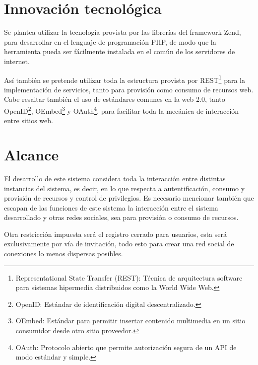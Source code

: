 \documentclass[letterpaper,11pt]{article}
\begin{document}
\section{Innovación tecnológica}
Se plantea utilizar la tecnología provista por las librerías del framework Zend, para
desarrollar en el lenguaje de programación PHP, de modo que la herramienta pueda ser
fácilmente instalada en el común de los servidores de internet.

Así también se pretende utilizar toda la estructura provista por REST\footnote{Representational
State Transfer (REST): Técnica de arquitectura software para sistemas hipermedia distribuidos
como la World Wide Web.} para la implementación de servicios, tanto para provisión como
consumo de recursos web. Cabe resaltar también el uso de estándares comunes en la web 2.0, 
tanto OpenID\footnote{OpenID: Estándar de identificación digital descentralizado.},
OEmbed\footnote{OEmbed: Estándar para permitir insertar contenido multimedia en un sitio
consumidor desde otro sitio proveedor.} y OAuth\footnote{OAuth: Protocolo abierto que permite
autorización segura de un API de modo estándar y simple.}, para facilitar toda la mecánica de
interacción entre sitios web.

\section{Alcance}
El desarrollo de este sistema considera toda la interacción entre distintas instancias del
sistema, es decir, en lo que respecta a autentificación, consumo y provisión de recursos y
control de privilegios. Es necesario mencionar también que escapan de las funciones de
este sistema la interacción entre el sistema desarrollado y otras redes sociales, sea para
provisión o consumo de recursos.

Otra restricción impuesta será el registro cerrado para usuarios, esta será exclusivamente 
por vía de invitación, todo esto para crear una red social de conexiones lo menos dispersas
posibles.
\end{document}
